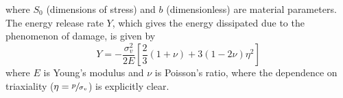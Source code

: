 \documentclass[sn-mathphys,Numbered,draft]{sn-jnl}%
\begin{document}
where $S_0$ (dimensions of stress) and $b$ (dimensionless) are material parameters.
The energy release rate $Y$, which gives the energy dissipated due to the phenomenon of damage, is given by \cite{lemaitre_engineering_2005}
\begin{equation} \label{eqn:classicY}
	Y
	=
	-\frac{\sigma_v^2}{2E}
	\left[
	\frac{2}{3} (1 + \nu) + 3 (1 - 2\nu) \eta^2
	\right]
\end{equation}
where $E$ is Young's modulus and $\nu$ is Poisson's ratio, where the dependence on triaxiality ($\eta = \sfrac{p}{\sigma_{v}}$) is explicitly clear.
\end{document}
